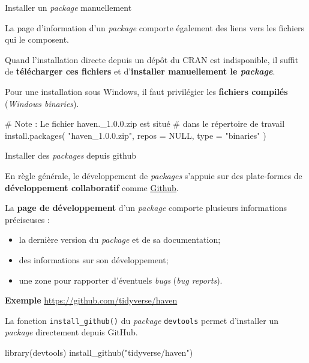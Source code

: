 \documentclass[12pt,ignorenonframetext,]{beamer}
\newenvironment{Shaded}{}{}
\newcommand{\KeywordTok}[1]{\textcolor[rgb]{0.00,0.00,1.00}{{#1}}}
\newcommand{\DataTypeTok}[1]{{#1}}
\newcommand{\StringTok}[1]{\textcolor[rgb]{0.00,0.50,0.50}{{#1}}}
\newcommand{\CommentTok}[1]{\textcolor[rgb]{0.00,0.50,0.00}{{#1}}}
\newcommand{\OtherTok}[1]{\textcolor[rgb]{1.00,0.25,0.00}{{#1}}}
\newcommand{\NormalTok}[1]{{#1}}
\providecommand{\tightlist}{%
\setlength{\itemsep}{0pt}\setlength{\parskip}{0pt}}
\renewenvironment{Shaded}{\begin{snugshade}}{\end{snugshade}}
\begin{document}
\begin{frame}[fragile]{Installer un \emph{package} manuellement}

La page d'information d'un \emph{package} comporte également des liens
vers les fichiers qui le composent.

Quand l'installation directe depuis un dépôt du CRAN est indisponible,
il suffit de \textbf{télécharger ces fichiers} et d'\textbf{installer
manuellement le \emph{package}}.

Pour une installation sous Windows, il faut privilégier les
\textbf{fichiers compilés} (\emph{Windows binaries}).

\pause \small

\begin{Shaded}
\begin{Highlighting}[]
\CommentTok{# Note : Le fichier haven._1.0.0.zip est situé }
\CommentTok{# dans le répertoire de travail}
\KeywordTok{install.packages}\NormalTok{(}
  \StringTok{"haven_1.0.0.zip"}\NormalTok{, }\DataTypeTok{repos =} \OtherTok{NULL}\NormalTok{, }\DataTypeTok{type =} \StringTok{"binaries"}
\NormalTok{)}
\end{Highlighting}
\end{Shaded}

\end{frame}

\begin{frame}[fragile]{Installer des \emph{packages} depuis github}

En règle générale, le développement de \emph{packages} s'appuie sur des
plate-formes de \textbf{développement collaboratif} comme
\href{https://github.com}{\underline{Github}}.

\pause La \textbf{page de développement} d'un \emph{package} comporte
plusieurs informations préciseuses :

\begin{itemize}
\tightlist
\item
  la dernière version du \emph{package} et de sa documentation;
\item
  des informations sur son développement;
\item
  une zone pour rapporter d'éventuels \emph{bugs} (\emph{bug reports}).
\end{itemize}

\textbf{Exemple} \url{https://github.com/tidyverse/haven}

\pause La fonction \texttt{install\_github()} du \emph{package}
\texttt{devtools} permet d'installer un \emph{package} directement
depuis GitHub.

\begin{Shaded}
\begin{Highlighting}[]
\KeywordTok{library}\NormalTok{(devtools)}
\KeywordTok{install_github}\NormalTok{(}\StringTok{"tidyverse/haven"}\NormalTok{)}
\end{Highlighting}
\end{Shaded}

\end{frame}
\end{document}
